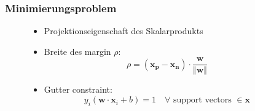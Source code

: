 \begin{frame}
    \frametitle{Minimierungsproblem}

    \begin{figure}[h]
        \begin{minipage}{0.4\textwidth} 
        \end{minipage}
        \hfill
        \begin{minipage}{0.4\textwidth}
            \begin{itemize}
                \item Projektionseigenschaft des Skalarprodukts
                \item Breite des margin $\rho$:
                    \begin{equation*}
                        \rho = (\boldsymbol{x_p} - \boldsymbol{x_n}) \cdot \frac{\boldsymbol{w}}{\Vert \boldsymbol{w} \Vert}
                    \end{equation*}
                \item Gutter constraint: 
                    \begin{equation*}
                        y_i ( \boldsymbol{w} \cdot \boldsymbol{x}_i + b ) = 1 \quad \forall \text{ support vectors } \in \boldsymbol{x}
                    \end{equation*}
            \end{itemize} 
        \end{minipage}


\end{figure}
\end{frame}
